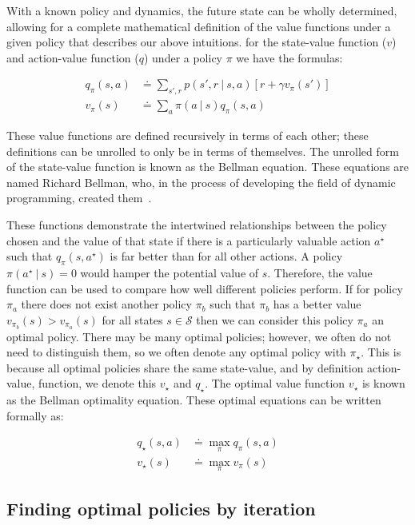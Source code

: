 \documentclass[]{final_report}
\begin{document}
With a known policy and dynamics, the future state can be wholly determined, allowing for a complete mathematical definition of the value functions under a given policy that describes our above intuitions. for the state-value function ($v$) and action-value function ($q$) under a policy $\pi$ we have the formulas:


\begin{align}
  q_\pi(s,a) & \doteq \sum_{s',r}p(s',r\ |\ s, a)[r + \gamma v_\pi(s')]\label{eqn:q-def} \\
  v_\pi(s)   & \doteq \sum_a \pi(a\ |\ s) q_\pi(s,a) \label{eqn:v-def}
\end{align}

These value functions are defined recursively in terms of each other; these definitions can be unrolled to only be in terms of themselves. The unrolled form of the state-value function is known as the Bellman equation. These equations are named Richard Bellman, who, in the process of developing the field of dynamic programming, created them~\cite{bellman1957}.   

These functions demonstrate the intertwined relationships between the policy chosen and the value of that state if there is a particularly valuable action $a^\star$ such that $q_\pi(s,a^\star)$ is far better than for all other actions. A policy $\pi(a^\star\ |\ s) = 0$ would hamper the potential value of $s$. Therefore, the value function can be used to compare how well different policies perform. If for policy $\pi_a$ there does not exist another policy $\pi_b$ such that $\pi_b$ has a better value $v_{\pi_b}(s) > v_{\pi_a}(s)$ for all states $s \in \mathcal{S}$ then we can consider this policy $\pi_a$ an optimal policy. There may be many optimal policies; however, we often do not need to distinguish them, so we often denote any optimal policy with $\pi_\star$. This is because all optimal policies share the same state-value, and by definition action-value, function, we denote this $ v_\star$ and $q_\star$. The optimal value function $v_\star$ is known as the Bellman optimality equation. These optimal equations can be written formally as:


\begin{align}
  q_\star(s,a) & \doteq \max_\pi q_\pi(s,a)\label{eqn:q-optimal-def} \\
  v_\star(s)   & \doteq \max_\pi v_\pi(s) \label{eqn:v-optimal-def}
\end{align}




\subsection{Finding optimal policies by iteration}\label{iteration-approaches}
\end{document}
